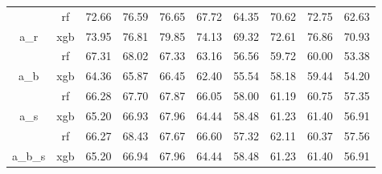 \begin{table}[t]
\begin{tabular}{cc|c|c|c|c|c|c|c|c|}
\multicolumn{1}{|c|}{}                          & rf  & 72.66   & 76.59   & 76.65   & 67.72      & 64.35   & 70.62   & 72.75   & 62.63      \\ \cline{2-10} 
\multicolumn{1}{|c|}{\multirow{-2}{*}{a\_r}}    & xgb & 73.95   & 76.81   & 79.85   & 74.13      & 69.32   & 72.61   & 76.86   & 70.93      \\ \hline
\multicolumn{1}{|c|}{}                          & rf  & 67.31   & 68.02   & 67.33   & 63.16      & 56.56   & 59.72   & 60.00   & 53.38      \\ \cline{2-10} 
\multicolumn{1}{|c|}{\multirow{-2}{*}{a\_b}}    & xgb & 64.36   & 65.87   & 66.45   & 62.40      & 55.54   & 58.18   & 59.44   & 54.20      \\ \hline
\multicolumn{1}{|c|}{}                          & rf  & 66.28   & 67.70   & 67.87   & 66.05      & 58.00   & 61.19   & 60.75   & 57.35      \\ \cline{2-10} 
\multicolumn{1}{|c|}{\multirow{-2}{*}{a\_s}}    & xgb & 65.20   & 66.93   & 67.96   & 64.44      & 58.48   & 61.23   & 61.40   & 56.91      \\ \hline
\multicolumn{1}{|c|}{}                          & rf  & 66.27   & 68.43   & 67.67   & 66.60      & 57.32   & 62.11   & 60.37   & 57.56      \\ \cline{2-10} 
\multicolumn{1}{|c|}{\multirow{-2}{*}{a\_b\_s}} & xgb & 65.20   & 66.94   & 67.96   & 64.44      & 58.48   & 61.23   & 61.40   & 56.91      \\ \hline
\end{tabular}
\end{table}


